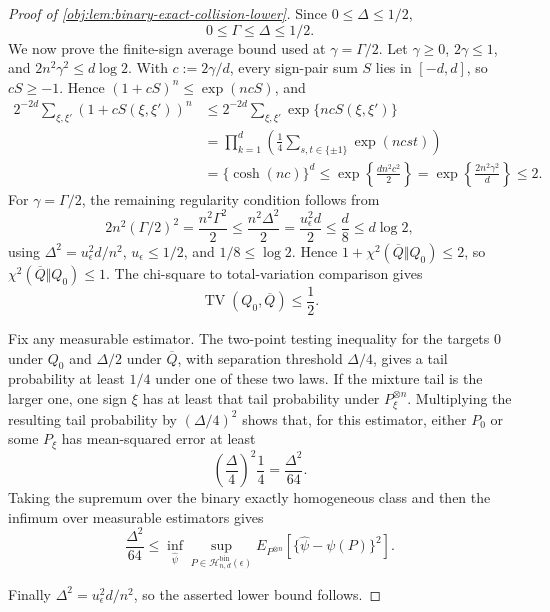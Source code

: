 \begin{proof}[Proof of \cref{obj:lem:binary-exact-collision-lower}]
Since \(0\le\Delta\le1/2\),
\[
0\le\Gamma\le\Delta\le1/2.
\]
We now prove the finite-sign average bound used at \(\gamma=\Gamma/2\).  Let \(\gamma\ge0\), \(2\gamma\le1\), and \(2n^2\gamma^2\le d\log2\).  With \(c:=2\gamma/d\), every sign-pair sum \(S\) lies in \([-d,d]\), so \(cS\ge-1\).  Hence \((1+cS)^n\le \exp(ncS)\), and
\[
\begin{aligned}
2^{-2d}\sum_{\xi,\xi'}(1+cS(\xi,\xi'))^n
&\le
2^{-2d}\sum_{\xi,\xi'}\exp\{ncS(\xi,\xi')\} \\
&=
\prod_{k=1}^d\left(\frac14\sum_{s,t\in\{\pm1\}}\exp(ncst)\right) \\
&=\{\cosh(nc)\}^d
\le \exp\left\{\frac{d n^2c^2}{2}\right\}
=\exp\left\{\frac{2n^2\gamma^2}{d}\right\}
\le 2.
\end{aligned}
\]
For \(\gamma=\Gamma/2\), the remaining regularity condition follows from
\[
2n^2(\Gamma/2)^2
=\frac{n^2\Gamma^2}{2}
\le \frac{n^2\Delta^2}{2}
=\frac{u_\epsilon^2d}{2}
\le \frac d8
\le d\log2,
\]
using \(\Delta^2=u_\epsilon^2d/n^2\), \(u_\epsilon\le1/2\), and \(1/8\le\log2\).  Hence \(1+\chi^2(\overline Q\Vert Q_0)\le2\), so \(\chi^2(\overline Q\Vert Q_0)\le1\).  The chi-square to total-variation comparison gives
\[
\operatorname{TV}(Q_0,\overline Q)\le\frac12 .
\] %

Fix any measurable estimator.  The two-point testing inequality for the targets \(0\) under \(Q_0\) and \(\Delta/2\) under \(\overline Q\), with separation threshold \(\Delta/4\), gives a tail probability at least \(1/4\) under one of these two laws.  If the mixture tail is the larger one, one sign \(\xi\) has at least that tail probability under \(P_\xi^{\otimes n}\).  Multiplying the resulting tail probability by \((\Delta/4)^2\) shows that, for this estimator, either \(P_0\) or some \(P_\xi\) has mean-squared error at least
\[
\left(\frac{\Delta}{4}\right)^2\frac14
=\frac{\Delta^2}{64}.
\]
Taking the supremum over the binary exactly homogeneous class and then the infimum over measurable estimators gives
\[
\frac{\Delta^2}{64}
\le
\inf_{\widehat\psi}\sup_{P\in\mathcal H_{n,d}^{\mathrm{bin}}(\epsilon)}
E_{P^{\otimes n}}\!\left[\{\widehat\psi-\psi(P)\}^2\right].
\] %

Finally \(\Delta^2=u_\epsilon^2d/n^2\), so the asserted lower bound follows.
\end{proof}
